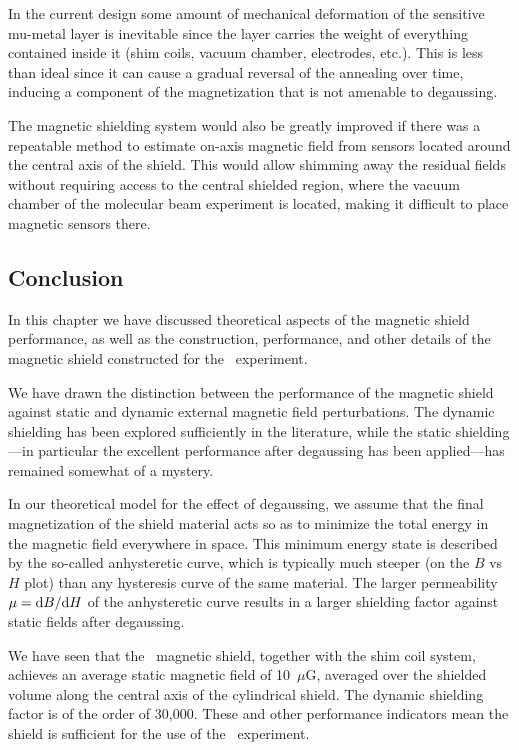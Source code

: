 In the current design some amount of mechanical deformation of the sensitive
mu-metal layer is inevitable since the layer carries the weight of everything
contained inside it (shim coils, vacuum chamber, electrodes, etc.). This is less
than ideal since it can cause a gradual reversal of the annealing over time,
inducing a component of the magnetization that is not amenable to degaussing.

The magnetic shielding system would also be greatly improved if there was a
repeatable method to estimate on-axis magnetic field from sensors located around
the central axis of the shield. This would allow shimming away the residual
fields without requiring access to the central shielded region, where the vacuum
chamber of the molecular beam experiment is located, making it difficult to
place magnetic sensors there.

\subsection{Conclusion}


In this chapter we have discussed theoretical aspects of the magnetic shield
performance, as well as the construction, performance, and other details of the
magnetic shield constructed for the \CENTREX\ experiment.

We have drawn the distinction between the performance of the
magnetic shield against static and dynamic external magnetic field
perturbations. The dynamic shielding has been explored sufficiently in the
literature, while the static shielding---in particular the excellent performance
after degaussing has been applied---has remained somewhat of a mystery.

In our theoretical model for the effect of degaussing, we assume that the final
magnetization of the shield material acts so as to minimize the total energy in
the magnetic field everywhere in space. This minimum energy state is described
by the so-called anhysteretic curve, which is typically much steeper (on the $B$
vs $H$ plot) than any hysteresis curve of the same material. The larger
permeability $\mu=\mathrm{d} B/\mathrm{d} H$ of the anhysteretic curve results in a larger
shielding factor against static fields after degaussing.


We have seen that the \CENTREX\ magnetic shield, together with
the shim coil system, achieves an average static magnetic field of 10~$\mu$G,
averaged over the shielded volume along the central axis of the cylindrical
shield. The dynamic shielding factor is of the order of 30,000. These and other
performance indicators mean the shield is sufficient for the use of the
\CENTREX\ experiment.

